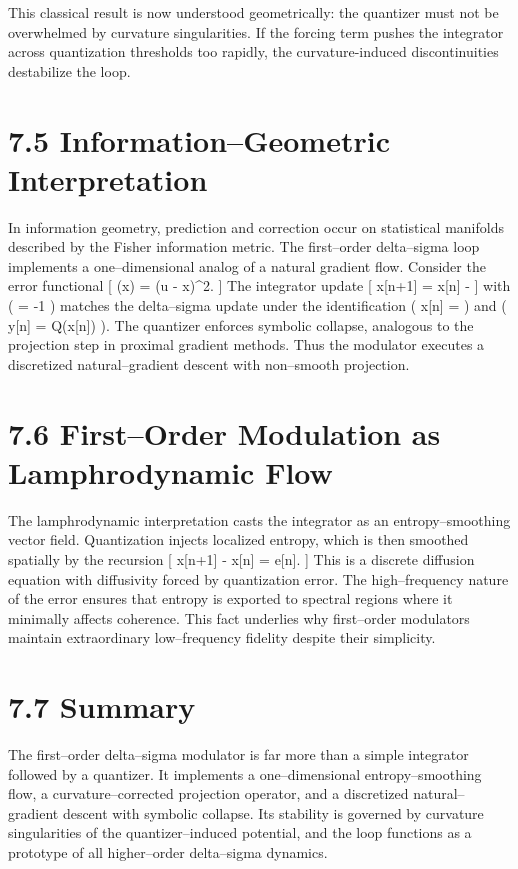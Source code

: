 This classical result is now understood geometrically: the quantizer must not be overwhelmed by curvature singularities. If the forcing term pushes the integrator across quantization thresholds too rapidly, the curvature-induced discontinuities destabilize the loop.

\section{7.5 Information–Geometric Interpretation}

In information geometry, prediction and correction occur on statistical manifolds described by the Fisher information metric. The first–order delta–sigma loop implements a one–dimensional analog of a natural gradient flow. Consider the error functional
[
(x) =  (u - x)^{2}.
]
The integrator update
[
x[n+1] = x[n] - \eta {}
]
with ( \eta = -1 ) matches the delta–sigma update under the identification ( x[n] =  ) and ( y[n] = Q(x[n]) ). The quantizer enforces symbolic collapse, analogous to the projection step in proximal gradient methods. Thus the modulator executes a discretized natural–gradient descent with non–smooth projection.

\section{7.6 First–Order Modulation as Lamphrodynamic Flow}

The lamphrodynamic interpretation casts the integrator as an entropy–smoothing vector field. Quantization injects localized entropy, which is then smoothed spatially by the recursion
[
x[n+1] - x[n] = e[n].
]
This is a discrete diffusion equation with diffusivity forced by quantization error. The high–frequency nature of the error ensures that entropy is exported to spectral regions where it minimally affects coherence. This fact underlies why first–order modulators maintain extraordinary low–frequency fidelity despite their simplicity.

\section{7.7 Summary}

The first–order delta–sigma modulator is far more than a simple integrator followed by a quantizer. It implements a one–dimensional entropy–smoothing flow, a curvature–corrected projection operator, and a discretized natural–gradient descent with symbolic collapse. Its stability is governed by curvature singularities of the quantizer–induced potential, and the loop functions as a prototype of all higher–order delta–sigma dynamics.
